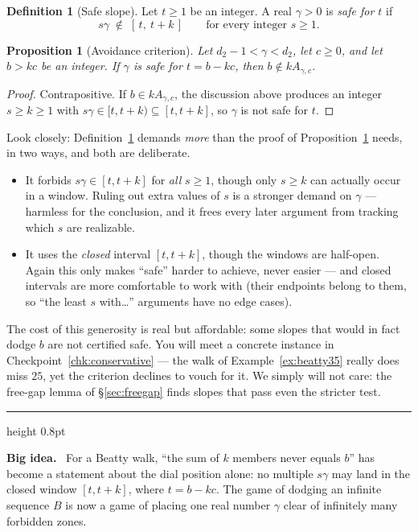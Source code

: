 \documentclass[11pt,reqno]{amsart}
\theoremstyle{plain}
\newtheorem{proposition}[theorem]{Proposition}
\theoremstyle{definition}
\newtheorem{definition}[theorem]{Definition}
\theoremstyle{remark}
\newenvironment{bigidea}
  {\par\medskip\noindent\hspace*{0.02\linewidth}%
   \begin{minipage}{0.96\linewidth}
   {\color{blue!55!black}\hrule height 0.8pt}\vspace{6pt}
   \noindent\textbf{Big idea.}\ }
  {\par\vspace{6pt}{\color{blue!55!black}\hrule height 0.8pt}%
   \end{minipage}\par\medskip}
\begin{document}
\begin{definition}[Safe slope]\label{def:safe}
Let $t \ge 1$ be an integer. A real $\gamma > 0$ is \emph{safe for $t$} if
\[
  s\gamma \;\notin\; [\,t,\ t + k\,] \qquad \text{for every integer } s \ge 1 .
\]
\end{definition}

\begin{proposition}[Avoidance criterion]\label{prop:criterion}
Let $d_2 - 1 < \gamma < d_2$, let $c \ge 0$, and let $b > kc$ be an integer. If
$\gamma$ is safe for $t = b - kc$, then $b \notin k A_{\gamma,c}$.
\end{proposition}

\begin{proof}
Contrapositive. If $b \in k A_{\gamma,c}$, the discussion above produces an integer
$s \ge k \ge 1$ with $s\gamma \in [t, t+k) \subseteq [t, t+k]$, so $\gamma$ is not
safe for $t$.
\end{proof}

Look closely: Definition~\ref{def:safe} demands \emph{more} than the proof of
Proposition~\ref{prop:criterion} needs, in two ways, and both are deliberate.

\begin{itemize}
\item It forbids $s\gamma \in [t, t+k]$ for \emph{all} $s \ge 1$, though only
      $s \ge k$ can actually occur in a window. Ruling out extra values of $s$ is a
      stronger demand on $\gamma$ --- harmless for the conclusion, and it frees every
      later argument from tracking which $s$ are realizable.
\item It uses the \emph{closed} interval $[t, t+k]$, though the windows are half-open.
      Again this only makes ``safe'' harder to achieve, never easier --- and closed
      intervals are more comfortable to work with (their endpoints belong to them, so
      ``the least $s$ with\dots'' arguments have no edge cases).
\end{itemize}

The cost of this generosity is real but affordable: some slopes that would in fact
dodge $b$ are not certified safe. You will meet a concrete instance in
Checkpoint~\ref{chk:conservative} --- the walk of Example~\ref{ex:beatty35} really
does miss $25$, yet the criterion declines to vouch for it. We simply will not care:
the free-gap lemma of \S\ref{sec:freegap} finds slopes that pass even the stricter
test.

\begin{bigidea}
For a Beatty walk, ``the sum of $k$ members never equals $b$'' has become a statement
about the dial position alone: no multiple $s\gamma$ may land in the closed window
$[t, t+k]$, where $t = b - kc$. The game of dodging an infinite sequence $B$ is now a
game of placing one real number $\gamma$ clear of infinitely many forbidden zones.
\end{bigidea}
\end{document}
